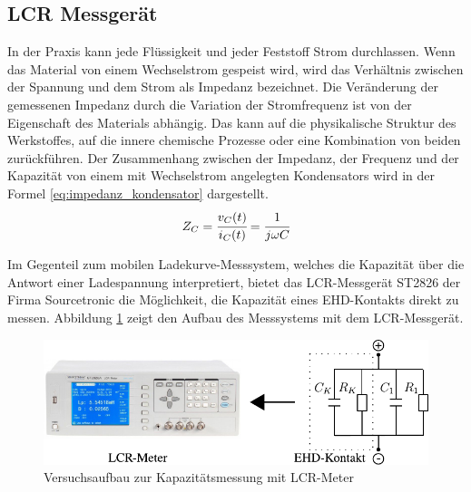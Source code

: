 %
\subsection{LCR Messgerät}
\label{sub:lcr_messgeraet}

In der Praxis kann jede Flüssigkeit und jeder Feststoff Strom durchlassen.
Wenn das Material von einem Wechselstrom gespeist wird, wird das Verhältnis zwischen der Spannung und dem Strom als Impedanz bezeichnet.
Die Veränderung der gemessenen Impedanz durch die Variation der Stromfrequenz ist von der Eigenschaft des Materials abhängig.
Das kann auf die physikalische Struktur des Werkstoffes, auf die innere chemische Prozesse oder eine Kombination von beiden zurückführen.
Der Zusammenhang zwischen der Impedanz, der Frequenz und der Kapazität von einem mit Wechselstrom angelegten Kondensators wird in der Formel \ref{eq:impedanz_kondensator} \cite{impedance} dargestellt.
%
\begin{equation}
    Z_{C} = \cfrac{v_C(t)}{i_C(t)} = \cfrac{1}{j \omega C}
    \label{eq:impedanz_kondensator}
\end{equation}

Im Gegenteil zum mobilen Ladekurve-Messsystem, welches die Kapazität über die Antwort einer Ladespannung interpretiert, bietet das LCR-Messgerät ST2826 der Firma Sourcetronic die Möglichkeit, die Kapazität eines EHD-Kontakts direkt zu messen.
Abbildung \ref{fig:versuchsaufbau_zur_kapazitaetsmessung_mit_lcr_meter} zeigt den Aufbau des Messsystems mit dem LCR-Messgerät.
\begin{figure}[htb]
    \centering
    \includegraphics[]{./images/versuchsaufbau_mit_lcr_meter.pdf}
    \caption{Versuchsaufbau zur Kapazitätsmessung mit LCR-Meter}
    \label{fig:versuchsaufbau_zur_kapazitaetsmessung_mit_lcr_meter}
\end{figure}


